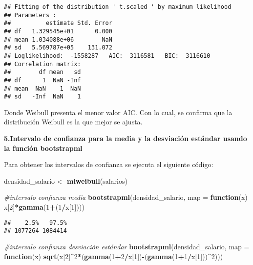 \documentclass[
]{article}
\newenvironment{Shaded}{\begin{snugshade}}{\end{snugshade}}
\newcommand{\AttributeTok}[1]{\textcolor[rgb]{0.13,0.29,0.53}{#1}}
\newcommand{\CommentTok}[1]{\textcolor[rgb]{0.56,0.35,0.01}{\textit{#1}}}
\newcommand{\ControlFlowTok}[1]{\textcolor[rgb]{0.13,0.29,0.53}{\textbf{#1}}}
\newcommand{\DecValTok}[1]{\textcolor[rgb]{0.00,0.00,0.81}{#1}}
\newcommand{\FunctionTok}[1]{\textcolor[rgb]{0.13,0.29,0.53}{\textbf{#1}}}
\newcommand{\NormalTok}[1]{#1}
\newcommand{\OtherTok}[1]{\textcolor[rgb]{0.56,0.35,0.01}{#1}}
\newcommand{\SpecialCharTok}[1]{\textcolor[rgb]{0.81,0.36,0.00}{\textbf{#1}}}
\begin{document}
\begin{verbatim}
## Fitting of the distribution ' t.scaled ' by maximum likelihood 
## Parameters : 
##          estimate Std. Error
## df   1.329545e+01      0.000
## mean 1.034088e+06        NaN
## sd   5.569787e+05    131.072
## Loglikelihood:  -1558287   AIC:  3116581   BIC:  3116610 
## Correlation matrix:
##        df mean   sd
## df      1  NaN -Inf
## mean  NaN    1  NaN
## sd   -Inf  NaN    1
\end{verbatim}

Donde Weibull presenta el menor valor AIC. Con lo cual, se confirma que
la distribución Weibull es la que mejor se ajusta.

\textbf{5.Intervalo de confianza para la media y la desviación estándar
usando la función bootstrapml}

Para obtener los intervalos de confianza se ejecuta el siguiente código:

\begin{Shaded}
\begin{Highlighting}[]
\NormalTok{densidad\_salario }\OtherTok{\textless{}{-}} \FunctionTok{mlweibull}\NormalTok{(salarios)}

\CommentTok{\#intervalo confianza media}
\FunctionTok{bootstrapml}\NormalTok{(densidad\_salario, }\AttributeTok{map =} \ControlFlowTok{function}\NormalTok{(x) x[}\DecValTok{2}\NormalTok{]}\SpecialCharTok{*}\FunctionTok{gamma}\NormalTok{(}\DecValTok{1}\SpecialCharTok{+}\NormalTok{(}\DecValTok{1}\SpecialCharTok{/}\NormalTok{x[}\DecValTok{1}\NormalTok{])))}
\end{Highlighting}
\end{Shaded}

\begin{verbatim}
##    2.5%   97.5% 
## 1077264 1084414
\end{verbatim}

\begin{Shaded}
\begin{Highlighting}[]
\CommentTok{\#intervalo confianza desviación estándar}
\FunctionTok{bootstrapml}\NormalTok{(densidad\_salario, }\AttributeTok{map =} \ControlFlowTok{function}\NormalTok{(x) }\FunctionTok{sqrt}\NormalTok{(x[}\DecValTok{2}\NormalTok{]}\SpecialCharTok{\^{}}\DecValTok{2}\SpecialCharTok{*}\NormalTok{(}\FunctionTok{gamma}\NormalTok{(}\DecValTok{1}\SpecialCharTok{+}\DecValTok{2}\SpecialCharTok{/}\NormalTok{x[}\DecValTok{1}\NormalTok{])}\SpecialCharTok{{-}}\NormalTok{(}\FunctionTok{gamma}\NormalTok{(}\DecValTok{1}\SpecialCharTok{+}\DecValTok{1}\SpecialCharTok{/}\NormalTok{x[}\DecValTok{1}\NormalTok{]))}\SpecialCharTok{\^{}}\DecValTok{2}\NormalTok{)))}
\end{Highlighting}
\end{Shaded}
\end{document}
